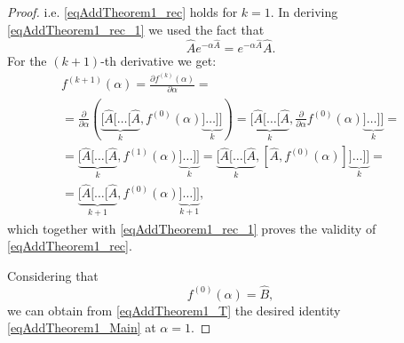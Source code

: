 \begin{theorem}
\begin{proof}
i.e. \eqref{eqAddTheorem1_rec} holds for $k = 1$. In deriving
\eqref{eqAddTheorem1_rec_1} we used the fact that 
\begin{equation}
\hat{A}e^{-\alpha\hat{A}} = e^{-\alpha\hat{A}} \hat{A}.
\nonumber
\end{equation}
For the $(k+1)$-th derivative we get:
\begin{eqnarray}
f^{(k + 1)}\left(\alpha\right) = 
\frac{\partial f^{(k)}\left(\alpha\right)}{\partial \alpha} =
\nonumber \\
=\frac{\partial }{\partial \alpha}
\left(
\underbrace{
[\hat{A}[\dots[\hat{A}}_{k},
f^{(0)}\left(\alpha\right)
\underbrace{]\dots]]}_{k} \right) =  
\underbrace{
[\hat{A}[\dots[\hat{A}}_{k},
\frac{\partial }{\partial \alpha}f^{(0)}\left(\alpha\right)
\underbrace{]\dots]]}_{k} =
\nonumber \\
= 
\underbrace{
[\hat{A}[\dots[\hat{A}}_{k},
f^{(1)}\left(\alpha\right)
\underbrace{]\dots]]}_{k} =
\underbrace{
[\hat{A}[\dots[\hat{A}}_{k},
\left[\hat{A}, f^{(0)}\left(\alpha\right)\right]
\underbrace{]\dots]]}_{k} =
\nonumber \\
=
\underbrace{
[\hat{A}[\dots[\hat{A}}_{k + 1},
f^{(0)}\left(\alpha\right)
\underbrace{]\dots]]}_{k + 1},
\nonumber
\end{eqnarray}
which together with \eqref{eqAddTheorem1_rec_1} proves the validity 
of \eqref{eqAddTheorem1_rec}.

Considering that 
\begin{equation}
f^{(0)}\left(\alpha\right) = \hat{B},
\nonumber
\end{equation}
we can obtain from \eqref{eqAddTheorem1_T} the desired identity
\eqref{eqAddTheorem1_Main} at $\alpha = 1$. 
\end{proof}
\end{theorem}